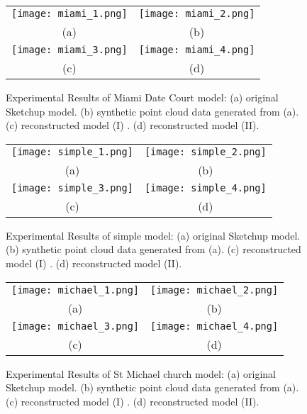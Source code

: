 \begin{figure} [htbp]
\begin{center}
\begin{tabular}{cc}
\texttt{[image: miami\_1.png]} &
\texttt{[image: miami\_2.png]} \\
(a) & (b) \\
\texttt{[image: miami\_3.png]} &
\texttt{[image: miami\_4.png]} \\
(c) & (d)
\end{tabular}
\end{center}
\caption{Experimental Results of Miami Date Court model:
      (a) original Sketchup model.
      (b) synthetic point cloud data generated from (a).
      (c) reconstructed model (I) .
      (d) reconstructed model (II).}
\label{fig:ER_Fig8}
\end{figure}

\begin{figure} [htbp]
\begin{center}
\begin{tabular}{cc}
\texttt{[image: simple\_1.png]} &
\texttt{[image: simple\_2.png]} \\
(a) & (b) \\
\texttt{[image: simple\_3.png]} &
\texttt{[image: simple\_4.png]} \\
(c) & (d)
\end{tabular}
\end{center}
\caption{Experimental Results of simple model:
      (a) original Sketchup model.
      (b) synthetic point cloud data generated from (a).
      (c) reconstructed model (I) .
      (d) reconstructed model (II).}
\label{fig:ER_Fig9}
\end{figure}

\begin{figure} [htbp]
\begin{center}
\begin{tabular}{cc}
\texttt{[image: michael\_1.png]} &
\texttt{[image: michael\_2.png]} \\
(a) & (b) \\
\texttt{[image: michael\_3.png]} &
\texttt{[image: michael\_4.png]} \\
(c) & (d)
\end{tabular}
\end{center}
\caption{Experimental Results of St Michael church model:
      (a) original Sketchup model.
      (b) synthetic point cloud data generated from (a).
      (c) reconstructed model (I) .
      (d) reconstructed model (II).}
\label{fig:ER_Fig10}
\end{figure}


